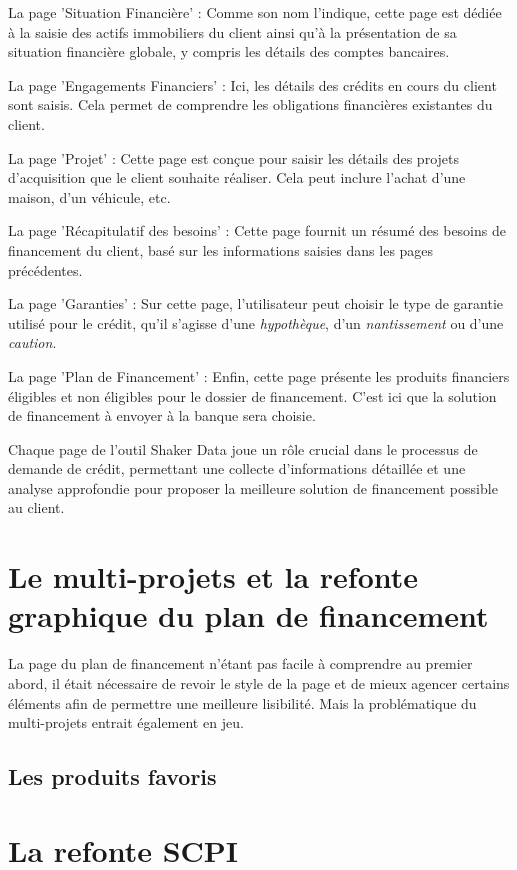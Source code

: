 \documentclass[12pt,oneside,noprintercorrection]{iut}
\begin{document}
La page 'Situation Financière' : Comme son nom l'indique, cette page est dédiée à la saisie des actifs immobiliers du client ainsi qu'à la présentation de sa situation financière globale, y compris les détails des comptes bancaires.

La page 'Engagements Financiers' : Ici, les détails des crédits en cours du client sont saisis. Cela permet de comprendre les obligations financières existantes du client.

La page 'Projet' : Cette page est conçue pour saisir les détails des projets d'acquisition que le client souhaite réaliser. Cela peut inclure l'achat d'une maison, d'un véhicule, etc.

La page 'Récapitulatif des besoins' : Cette page fournit un résumé des besoins de financement du client, basé sur les informations saisies dans les pages précédentes.

La page 'Garanties' : Sur cette page, l'utilisateur peut choisir le type de garantie utilisé pour le crédit, qu'il s'agisse d'une \textit{hypothèque}, d'un \textit{nantissement} ou d'une \textit{caution}.

La page 'Plan de Financement' : Enfin, cette page présente les produits financiers éligibles et non éligibles pour le dossier de financement. C'est ici que la solution de financement à envoyer à la banque sera choisie.

Chaque page de l'outil Shaker Data joue un rôle crucial dans le processus de demande de crédit, permettant une collecte d'informations détaillée et une analyse approfondie pour proposer la meilleure solution de financement possible au client.

\section{Le multi-projets et la refonte graphique du plan de financement}

La page du plan de financement n'étant pas facile à comprendre au premier abord, il était nécessaire de revoir le style de la page et de mieux agencer certains éléments afin de permettre une meilleure lisibilité. Mais la problématique du multi-projets entrait également en jeu. 


\subsection{Les produits favoris}

\section{La refonte SCPI}
\end{document}
